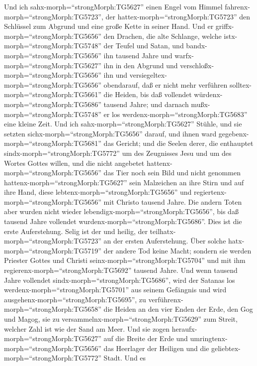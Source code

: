  Und ich sahx-morph=``strongMorph:TG5627'' einen Engel vom
Himmel fahrenx-morph=``strongMorph:TG5723'', der
hattex-morph=``strongMorph:TG5723'' den Schlüssel zum Abgrund und eine
große Kette in seiner Hand.  Und er
griffx-morph=``strongMorph:TG5656'' den Drachen, die alte Schlange,
welche istx-morph=``strongMorph:TG5748'' der Teufel und Satan, und
bandx-morph=``strongMorph:TG5656'' ihn tausend Jahre  und
warfx-morph=``strongMorph:TG5627'' ihn in den Abgrund und
verschloßx-morph=``strongMorph:TG5656'' ihn und
versiegeltex-morph=``strongMorph:TG5656'' obendarauf, daß er nicht mehr
verführen solltex-morph=``strongMorph:TG5661'' die Heiden, bis daß
vollendet würdenx-morph=``strongMorph:TG5686'' tausend Jahre; und
darnach mußx-morph=``strongMorph:TG5748'' er los
werdenx-morph=``strongMorph:TG5683'' eine kleine Zeit.  Und
ich sahx-morph=``strongMorph:TG5627'' Stühle, und sie setzten
sichx-morph=``strongMorph:TG5656'' darauf, und ihnen ward
gegebenx-morph=``strongMorph:TG5681'' das Gericht; und die Seelen derer,
die enthauptet sindx-morph=``strongMorph:TG5772'' um des Zeugnisses Jesu
und um des Wortes Gottes willen, und die nicht angebetet
hattenx-morph=``strongMorph:TG5656'' das Tier noch sein Bild und nicht
genommen hattenx-morph=``strongMorph:TG5627'' sein Malzeichen an ihre
Stirn und auf ihre Hand, diese lebtenx-morph=``strongMorph:TG5656'' und
regiertenx-morph=``strongMorph:TG5656'' mit Christo tausend Jahre.
 Die andern Toten aber wurden nicht wieder
lebendigx-morph=``strongMorph:TG5656'', bis daß tausend Jahre vollendet
wurdenx-morph=``strongMorph:TG5686''. Dies ist die erste Auferstehung.
 Selig ist der und heilig, der
teilhatx-morph=``strongMorph:TG5723'' an der ersten Auferstehung. Über
solche hatx-morph=``strongMorph:TG5719'' der andere Tod keine Macht;
sondern sie werden Priester Gottes und Christi
seinx-morph=``strongMorph:TG5704'' und mit ihm
regierenx-morph=``strongMorph:TG5692'' tausend Jahre.  Und
wenn tausend Jahre vollendet sindx-morph=``strongMorph:TG5686'', wird
der Satanas los werdenx-morph=``strongMorph:TG5701'' aus seinem
Gefängnis  und wird ausgehenx-morph=``strongMorph:TG5695'',
zu verführenx-morph=``strongMorph:TG5658'' die Heiden an den vier Enden
der Erde, den Gog und Magog, sie zu
versammelnx-morph=``strongMorph:TG5629'' zum Streit, welcher Zahl ist
wie der Sand am Meer.  Und sie zogen
heraufx-morph=``strongMorph:TG5627'' auf die Breite der Erde und
umringtenx-morph=``strongMorph:TG5656'' das Heerlager der Heiligen und
die geliebtex-morph=``strongMorph:TG5772'' Stadt. Und es
